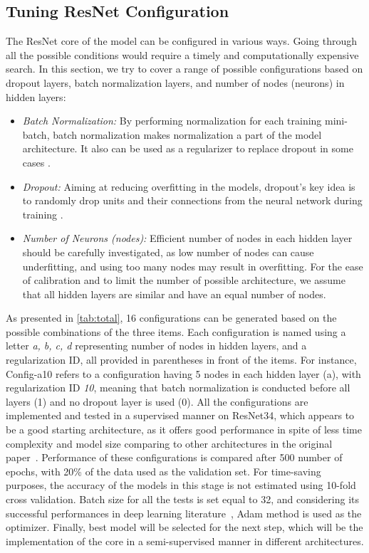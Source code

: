  \subsection{Tuning ResNet Configuration}
 The ResNet core of the model can be configured in various ways. Going through all the possible conditions would require a timely and computationally expensive search. In this section, we try to cover a range of possible configurations based on dropout layers, batch normalization layers, and number of nodes (neurons) in hidden layers:
 \begin{itemize}
     \item \emph{Batch Normalization:} By performing normalization for each training mini-batch, batch normalization makes normalization a part of the model architecture. It also can be used as a regularizer to replace dropout in some cases \cite{ioffe2015batch}. 
     \item \emph{Dropout:} Aiming at reducing overfitting in the models, dropout's key idea is to randomly drop units and their connections from the neural network during training \cite{srivastava2014dropout}. 
     \item \emph{Number of Neurons (nodes):} Efficient number of nodes in each hidden layer should be carefully investigated, as low number of nodes can cause underfitting, and using too many nodes may result in overfitting. For the ease of calibration and to limit the number of possible architecture, we assume that all hidden layers are similar and have an equal number of nodes.
 \end{itemize}
As presented in \cref{tab:total}, 16 configurations can be generated based on the possible combinations of the three items. Each configuration is named using a letter \textit{a, b, c, d} representing number of nodes in hidden layers, and a regularization ID, all provided in parentheses in front of the items. For instance, Config-a10 refers to a configuration having 5 nodes in each hidden layer (a), with regularization ID \textit{10}, meaning that batch normalization is conducted before all layers (1) and no dropout layer is used (0).  All the configurations are implemented and tested in a supervised manner on ResNet34, which appears to be a good starting architecture, as it offers good performance in spite of less time complexity and model size comparing to other architectures in the original paper~\cite{he2016deep}. Performance of these configurations is compared after 500 number of epochs, with 20\%  of the data used as the validation set. For time-saving purposes, the accuracy of the models in this stage is not estimated using 10-fold cross validation. Batch size for all the tests is set equal to 32, and considering its successful performances in deep learning literature~\cite{kingma2014adam}, Adam method is used as the optimizer. Finally, best model will be selected for the next step, which will be the implementation of the core in a semi-supervised manner in different architectures.

